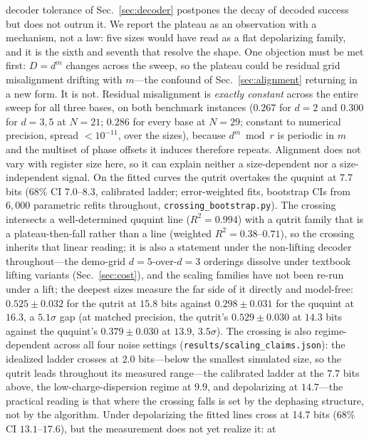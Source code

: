 \documentclass[aps,pra,reprint,superscriptaddress,nofootinbib,floatfix]{revtex4-2}
\begin{document}
decoder tolerance of Sec.~\ref{sec:decoder} postpones the decay of
decoded success but does not outrun it. We report the plateau as an
observation with a mechanism, not a law: five sizes would have read as
a flat depolarizing family, and it is the sixth and seventh that
resolve the shape. One objection must be met first: $D=d^m$ changes across the
sweep, so the plateau could be residual grid misalignment drifting
with $m$---the confound of Sec.~\ref{sec:alignment} returning in a new
form. It is not. Residual misalignment is \emph{exactly constant}
across the entire sweep for all three bases, on both benchmark
instances ($0.267$ for $d=2$ and $0.300$ for $d=3,5$ at $N=21$;
$0.286$ for every base at $N=29$; constant to numerical precision,
spread ${<}10^{-11}$, over the
sizes), because $d^m \bmod r$ is periodic in $m$ and the multiset of
phase offsets it induces therefore repeats. Alignment does not vary
with register size here, so it can explain neither a size-dependent
nor a size-independent signal. On the fitted curves the qutrit
overtakes the ququint at 7.7 bits ($68\%$ CI $7.0$--$8.3$,
calibrated ladder; error-weighted fits, bootstrap CIs from $6{,}000$
parametric refits throughout, \texttt{crossing\_bootstrap.py}). The
crossing intersects a well-determined ququint line
($R^2=0.994$) with a qutrit family that is a plateau-then-fall
rather than a line (weighted $R^2=0.38$--$0.71$), so the crossing
inherits that linear reading; it is also a statement under the
non-lifting decoder throughout---the demo-grid $d{=}5$-over-$d{=}3$
orderings dissolve under textbook lifting variants
(Sec.~\ref{sec:cost}), and the scaling families have not been re-run
under a lift; the deepest sizes measure the far side
of it directly and model-free: $0.525\pm0.032$ for the qutrit at
$15.8$ bits against $0.298\pm0.031$ for the ququint at $16.3$, a
$5.1\sigma$ gap (at matched precision, the qutrit's $0.529\pm0.030$
at $14.3$ bits against the ququint's $0.379\pm0.030$ at $13.9$,
$3.5\sigma$). The crossing
is also regime-dependent across all four noise settings
(\texttt{results/scaling\_claims.json}): the idealized ladder
crosses at $2.0$ bits---below the smallest simulated size, so the
qutrit leads throughout its measured range---the
calibrated ladder at the $7.7$ bits above, the
low-charge-dispersion regime at $9.9$, and depolarizing at
$14.7$---the practical reading is that
where the crossing falls is set by the dephasing structure, not by
the algorithm. Under depolarizing the fitted lines cross at 14.7 bits ($68\%$
CI $13.1$--$17.6$), but the measurement does not yet realize it: at
\end{document}
